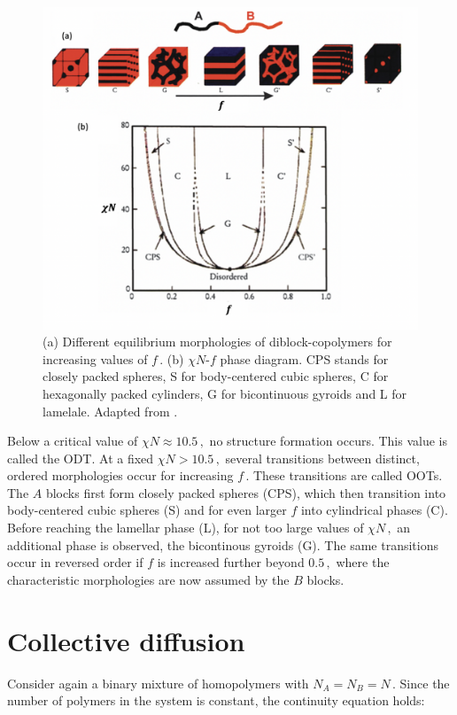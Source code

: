 \documentclass[bachelor,       %
               oneside,        %
               BCOR10mm,       %
               ngerman, english %
               ]{GAUBM}
\begin{document}
\begin{figure}[h]
  \centering
  \includegraphics[width=0.8\linewidth]{figures/diblock_phasediagram.png}
  \caption{(a) Different equilibrium morphologies of diblock-copolymers for increasing values of $f\,.$ (b) $\chi N$-$f$ phase diagram. CPS stands for closely packed spheres, S for body-centered cubic spheres, C for hexagonally packed cylinders, G for bicontinuous gyroids and L for lamelale. Adapted from \cite{Mai_diblock_selfassembly}. }
  \label{fig:diblock_phasediagram}
\end{figure}

Below a critical value of $\chi N\approx 10.5\,,$ no structure formation occurs. This value is called the \ac{ODT}. At a fixed $\chi N> 10.5\,,$ several transitions between distinct, ordered morphologies occur for increasing $f\,.$ These transitions are called \acp{OOT}. The $A$ blocks first form closely packed spheres (CPS), which then transition into body-centered cubic spheres (S) and for even larger $f$ into cylindrical phases (C). Before reaching the lamellar phase (L), for not too large values of $\chi N\,,$ an additional phase is observed, the bicontinous gyroids (G). The same transitions occur in reversed order if $f$ is increased further beyond $0.5\,,$ where the characteristic morphologies are now assumed by the $B$ blocks.

\section{Collective diffusion}

Consider again a binary mixture of homopolymers with $N_A=N_B=N\,$. Since the number of polymers in the system is constant, the continuity equation holds:
\end{document}
